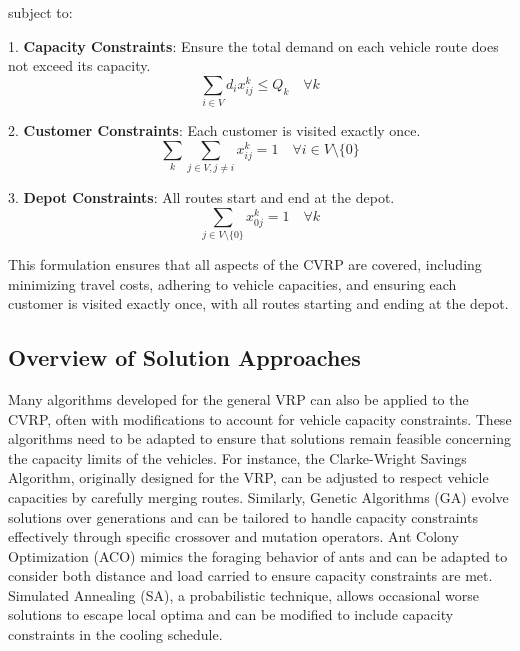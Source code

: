 \documentclass{article}
\begin{document}
    subject to:

    1. \textbf{Capacity Constraints}: Ensure the total demand on each vehicle route does not exceed its capacity.
    \begin{equation}
        \sum_{i \in V} d_i x_{ij}^k \leq Q_k \quad \forall k
    \end{equation}

    2. \textbf{Customer Constraints}: Each customer is visited exactly once.
    \begin{equation}
        \sum_{k} \sum_{j \in V, j \neq i} x_{ij}^k = 1 \quad \forall i \in V \setminus \{0\}
    \end{equation}

    3. \textbf{Depot Constraints}: All routes start and end at the depot.
    \begin{equation}
        \sum_{j \in V \setminus \{0\}} x_{0j}^k = 1 \quad \forall k
    \end{equation}

    This formulation ensures that all aspects of the CVRP are covered, including minimizing travel costs, adhering to vehicle capacities, and ensuring each customer is visited exactly once, with all routes starting and ending at the depot. \cite{toth2014vehicle}

    \subsection{Overview of Solution Approaches}\label{subsec:overview-of-solution-approaches}

    Many algorithms developed for the general VRP can also be applied to the CVRP, often with modifications to account for vehicle capacity constraints. These algorithms need to be adapted to ensure that solutions remain feasible concerning the capacity limits of the vehicles. For instance, the Clarke-Wright Savings Algorithm, originally designed for the VRP, can be adjusted to respect vehicle capacities by carefully merging routes. Similarly, Genetic Algorithms (GA) evolve solutions over generations and can be tailored to handle capacity constraints effectively through specific crossover and mutation operators. Ant Colony Optimization (ACO) mimics the foraging behavior of ants and can be adapted to consider both distance and load carried to ensure capacity constraints are met. Simulated Annealing (SA), a probabilistic technique, allows occasional worse solutions to escape local optima and can be modified to include capacity constraints in the cooling schedule.
\end{document}
